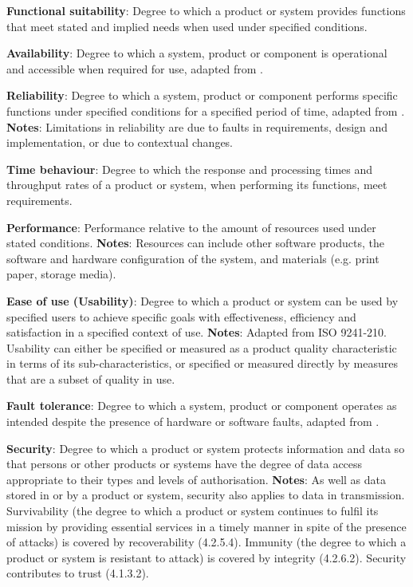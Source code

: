 \textbf{Functional suitability}: Degree to which a product or system provides functions that meet stated and implied needs when used under specified conditions.

\textbf{Availability}: Degree to which a system, product or component is operational and accessible when required for use, adapted from \cite{iso_central_secretary_isoiecieee_2010}.

\textbf{Reliability}: Degree to which a system, product or component performs specific functions under specified conditions for a specified period of time, adapted from \cite{iso_central_secretary_isoiecieee_2010}. \textbf{Notes}: Limitations in reliability are due to faults in requirements, design and implementation, or due to contextual changes.

\textbf{Time behaviour}: Degree to which the response and processing times and throughput rates of a product or system, when performing its functions, meet requirements.

\textbf{Performance}: Performance relative to the amount of resources used under stated conditions. \textbf{Notes}: Resources can include other software products, the software and hardware configuration of the system, and materials (e.g. print paper, storage media).

\textbf{Ease of use (Usability)}: Degree to which a product or system can be used by specified users to achieve specific goals with effectiveness, efficiency and satisfaction in a specified context of use. \textbf{Notes}: Adapted from ISO 9241-210. Usability can either be specified or measured as a product quality characteristic in terms of its sub-characteristics, or specified or measured directly by measures that are a subset of quality in use.

\textbf{Fault tolerance}: Degree to which a system, product or component operates as intended despite the presence of hardware or software faults, adapted from \cite{iso_central_secretary_isoiecieee_2010}.

\textbf{Security}: Degree to which a product or system protects information and data so that persons or other products or systems have the degree of data access appropriate to their types and levels of authorisation. \textbf{Notes}: As well as data stored in or by a product or system, security also applies to data in transmission. Survivability (the degree to which a product or system continues to fulfil its mission by providing essential services in a timely manner in spite of the presence of attacks) is covered by recoverability (4.2.5.4). Immunity (the degree to which a product or system is resistant to attack) is covered by integrity (4.2.6.2). Security contributes to trust (4.1.3.2).

